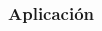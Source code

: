 \documentclass[14pt]{beamer}
\begin{document}
\begin{frame}
\frametitle{Aplicación}

\begin{columns}
\begin{column}{0.25\textwidth}
\begin{center}



\end{center}
\end{column}
\end{columns}
\end{frame}
\end{document}

